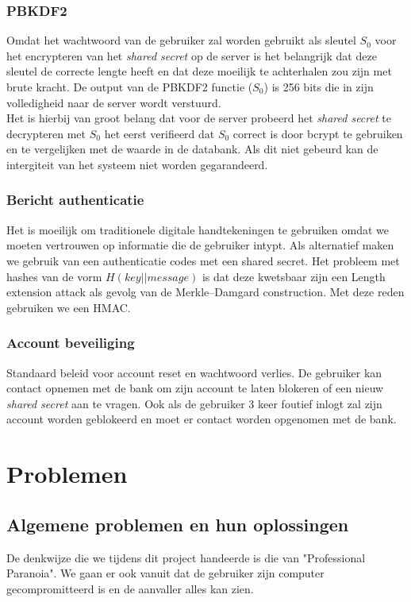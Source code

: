 \documentclass[11pt]{article}
\begin{document}
\subsubsection{PBKDF2}
\label{sec:pbkdf2}
Omdat het wachtwoord van de gebruiker zal worden gebruikt als sleutel $S_{0}$ voor het encrypteren van het \emph{shared secret} op de server is het belangrijk dat deze sleutel de correcte lengte heeft en dat deze moeilijk te achterhalen zou zijn met brute kracht. De output van de PBKDF2 functie ($S_{0}$) is 256 bits die in zijn volledigheid naar de server wordt verstuurd.\\

Het is hierbij van groot belang dat voor de server probeerd het \emph{shared secret} te decrypteren met $S_{0}$ het eerst verifieerd dat $S_{0}$ correct is door bcrypt te gebruiken en te vergelijken met de waarde in de databank. Als dit niet gebeurd kan de intergiteit van het systeem niet worden gegarandeerd. 
\subsubsection{Bericht authenticatie}
\label{sec:mac}
Het is moeilijk om traditionele digitale handtekeningen te gebruiken omdat we moeten vertrouwen op informatie die de gebruiker intypt. Als alternatief maken we gebruik van een authenticatie codes met een shared secret. Het probleem met hashes van de vorm $H(key || message)$ is dat deze kwetsbaar zijn een Length extension attack als gevolg van de Merkle–Damgard construction. Met deze reden gebruiken we een HMAC.
\subsubsection{Account beveiliging}
\label{sec:bev}
Standaard beleid voor account reset en wachtwoord verlies. De gebruiker kan contact opnemen met de bank om zijn account te laten blokeren of een nieuw \emph{shared secret} aan te vragen. Ook als de gebruiker 3 keer foutief inlogt zal zijn account worden geblokeerd en moet er contact worden opgenomen met de bank.
\section{Problemen}
\subsection{Algemene problemen en hun oplossingen}
De denkwijze die we tijdens dit project handeerde is die van "Professional Paranoia". We gaan er ook vanuit dat de gebruiker zijn computer gecompromitteerd is en de aanvaller alles kan zien.
\end{document}
